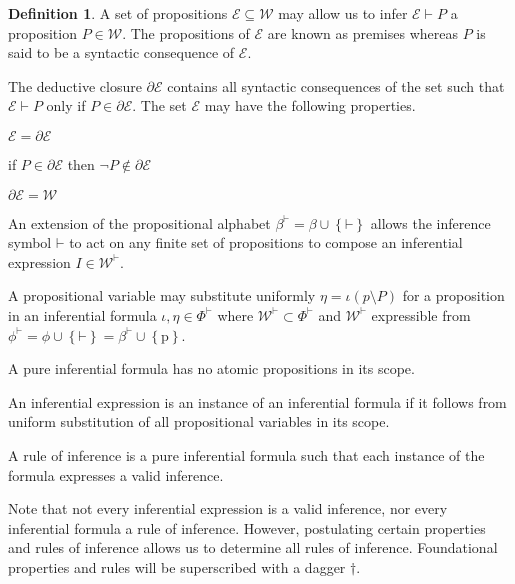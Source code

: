 \documentclass{amsbook}
\newcommand{\setsm}[1]{\left\{#1\right\}}
\newcommand{\wffs}{\mathcal W}
\newcommand{\infers}{\mathrel\vdash}
\theoremstyle{definition}
\newtheorem{dfn}{Definition}[section]
\begin{document}
\begin{dfn}
    A set of propositions $\mathcal E \subseteq \wffs$ may allow us to infer $\mathcal E \infers P$ a proposition $P \in \wffs$. The propositions of $\mathcal E$ are known as premises whereas $P$ is said to be a syntactic consequence of $\mathcal E$.

    The deductive closure $\partial \mathcal E$ contains all syntactic consequences of the set such that $\mathcal E \infers P$ only if $P \in \partial\mathcal E$. The set $\mathcal E$ may have the following properties.
    \begin{enumerate}[
            labelindent=\parindent,
            before={
                    \renewcommand\makelabel[1]{(##1).}
                }
        ]
        \item[deductively closed] $\mathcal E = \partial\mathcal E$
        \item[consistent] if $P \in \partial\mathcal E$ then $\neg P \notin \partial\mathcal E$
        \item[trivial] $\partial\mathcal E = \wffs$
    \end{enumerate}

    An extension of the propositional alphabet $\beta^{\mathord\vdash} = \beta \cup \setsm{\mathord\vdash}$ allows the inference symbol $\mathord\vdash$ to act on any finite set of propositions to compose an inferential expression $I \in \wffs^{\mathord\vdash}$.

    A propositional variable may substitute uniformly $\eta = \iota(p \setminus P)$ for a proposition in an inferential formula $\iota, \eta \in \Phi^{\mathord\vdash}$ where $\wffs^{\mathord\vdash} \subset \Phi^{\mathord\vdash}$ and $\wffs^{\mathord\vdash}$ expressible from $\phi^{\mathord\vdash} = \phi \cup \setsm{\mathord\vdash} = \beta^{\mathord\vdash} \cup \setsm{\mathrm p}$.

    A pure inferential formula has no atomic propositions in its scope.

    An inferential expression is an instance of an inferential formula if it follows from uniform substitution of all propositional variables in its scope.

    A rule of inference is a pure inferential formula such that each instance of the formula expresses a valid inference.
\end{dfn}

Note that not every inferential expression is a valid inference, nor every inferential formula a rule of inference. However, postulating certain properties and rules of inference allows us to determine all rules of inference. Foundational properties and rules will be superscribed with a dagger $\dag$.
\end{document}
